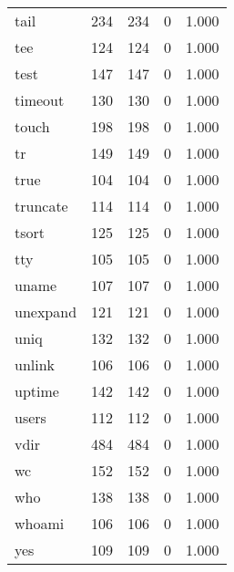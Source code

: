 \begin{longtable}{lp{4.5cm}p{4.5cm}p{4.5cm}p{4.5cm}}
tail      &                     234 &              234 &                 0 &                        1.000 \\
tee       &                     124 &              124 &                 0 &                        1.000 \\
test      &                     147 &              147 &                 0 &                        1.000 \\
timeout   &                     130 &              130 &                 0 &                        1.000 \\
touch     &                     198 &              198 &                 0 &                        1.000 \\
tr        &                     149 &              149 &                 0 &                        1.000 \\
true      &                     104 &              104 &                 0 &                        1.000 \\
truncate  &                     114 &              114 &                 0 &                        1.000 \\
tsort     &                     125 &              125 &                 0 &                        1.000 \\
tty       &                     105 &              105 &                 0 &                        1.000 \\
uname     &                     107 &              107 &                 0 &                        1.000 \\
unexpand  &                     121 &              121 &                 0 &                        1.000 \\
uniq      &                     132 &              132 &                 0 &                        1.000 \\
unlink    &                     106 &              106 &                 0 &                        1.000 \\
uptime    &                     142 &              142 &                 0 &                        1.000 \\
users     &                     112 &              112 &                 0 &                        1.000 \\
vdir      &                     484 &              484 &                 0 &                        1.000 \\
wc        &                     152 &              152 &                 0 &                        1.000 \\
who       &                     138 &              138 &                 0 &                        1.000 \\
whoami    &                     106 &              106 &                 0 &                        1.000 \\
yes       &                     109 &              109 &                 0 &                        1.000 \\
\end{longtable}
